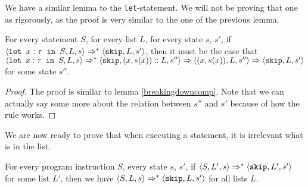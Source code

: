 We have a similar lemma to the \texttt{let}-statement. We will not be proving that one as rigorously, as the proof is very similar to the one of the previous lemma. 

\begin{lemma}
\label{breakingdownlet}
For every statement $S$, for every list $L$, for every state $s$, $s'$, if $\langle \texttt{let }x : \tau \texttt{ in } S, L, s \rangle \Rightarrow ^{*} \langle \texttt{skip}, L, s' \rangle$, then it must be the case that $\langle \texttt{let }x : \tau \texttt{ in } S, L, s \rangle \Rightarrow ^{*} \langle \texttt{skip}, (x,s(x))::L, s'' \rangle \Rightarrow \langle (x,s(x)), L, s'' \rangle \Rightarrow \langle \texttt{skip}, L, s' \rangle$ for some state $s''$. 
\end{lemma}

\begin{proof}
The proof is similar to lemma \ref{breakingdowncomp}. Note that we can actually say some more about the relation between $s''$ and $s'$ because of how the rule \setsos works. 
\end{proof}

We are now ready to prove that when executing a statement, it is irrelevant what is in the list.  

\begin{proposition}
\label{listsdontmatter}
For every program instruction $S$, every state $s$, $s'$, if $\langle S, L', s \rangle \Rightarrow ^{*} \langle \texttt{skip}, L', s' \rangle$ for some list $L'$, then we have $\langle S, L, s \rangle \Rightarrow ^{*} \langle \texttt{skip}, L, s' \rangle$ for all lists $L$. 
\end{proposition}

